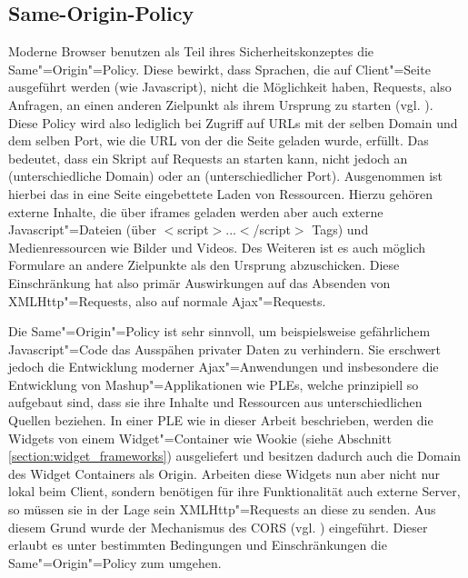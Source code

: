 \subsection{Same-Origin-Policy}\label{section:same_origin_policy}
Moderne Browser benutzen als Teil ihres Sicherheitskonzeptes die Same"=Origin"=Policy. Diese bewirkt, dass Sprachen, die auf Client"=Seite ausgeführt werden (wie Javascript), nicht die Möglichkeit haben, Requests, also Anfragen, an einen anderen Zielpunkt als ihrem Ursprung zu starten (vgl. \cite{Ruderman2008}). Diese Policy wird also lediglich bei Zugriff auf \acp{URL} mit der selben Domain und dem selben Port, wie die \ac{URL} von der die Seite geladen wurde, erfüllt. Das bedeutet, dass ein Skript auf  Requests an  starten kann, nicht jedoch an  (unterschiedliche Domain) oder an  (unterschiedlicher Port). Ausgenommen ist hierbei das in eine Seite eingebettete Laden von Ressourcen. Hierzu gehören externe Inhalte, die über iframes geladen werden aber auch externe Javascript"=Dateien (über $<$script$>$...$<$/script$>$ Tags) und Medienressourcen wie Bilder und Videos. Des Weiteren ist es auch möglich Formulare an andere Zielpunkte als den Ursprung abzuschicken. Diese Einschränkung hat also primär Auswirkungen auf das Absenden von XMLHttp"=Requests, also auf normale Ajax"=Requests.

Die Same"=Origin"=Policy ist sehr sinnvoll, um beispielsweise gefährlichem Javascript"=Code das Ausspähen privater Daten zu verhindern. Sie erschwert jedoch die Entwicklung moderner Ajax"=Anwendungen und insbesondere die Entwicklung von Mashup"=Applikationen wie \acp{PLE}, welche prinzipiell so aufgebaut sind, dass sie ihre Inhalte und Ressourcen aus unterschiedlichen Quellen beziehen. In einer \ac{PLE} wie in dieser Arbeit beschrieben, werden die Widgets von einem Widget"=Container wie Wookie (siehe Abschnitt \ref{section:widget_frameworks}) ausgeliefert und besitzen dadurch auch die Domain des Widget Containers als Origin. Arbeiten diese Widgets nun aber nicht nur lokal beim Client, sondern benötigen für ihre Funktionalität auch externe Server, so müssen sie in der Lage sein XMLHttp"=Requests an diese zu senden. Aus diesem Grund wurde der Mechanismus des \ac{CORS} (vgl. \cite{vanKesteren2012}) eingeführt. Dieser erlaubt es unter bestimmten Bedingungen und Einschränkungen die Same"=Origin"=Policy zum umgehen.

